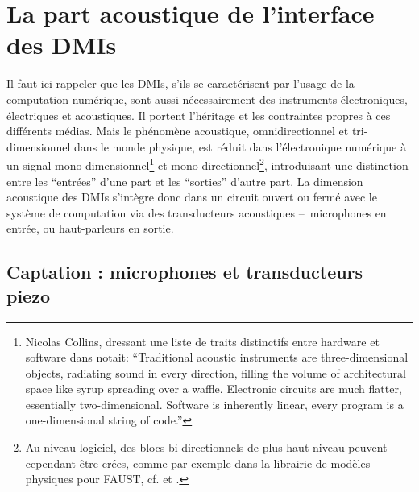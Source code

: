 \section{La part acoustique de l'interface des DMIs}
\label{sec:interfaces:part_acoustique}

\noindent Il faut ici rappeler que les \glspl{DMI}, s'ils se caractérisent par l'usage de la computation numérique, sont aussi nécessairement des instruments électroniques, électriques et acoustiques. Il portent l'héritage et les contraintes propres à ces différents médias. Mais le phénomène acoustique, omnidirectionnel et tri-dimensionnel dans le monde physique, est réduit dans l'électronique numérique à un signal mono-dimensionnel\footnote{Nicolas Collins, dressant une liste de traits distinctifs entre hardware et software dans \cite{collins_semiconducting_2013} notait: ``Traditional acoustic instruments are three-dimensional objects, radiating sound in every direction, filling the volume of architectural space like syrup spreading over a waffle. Electronic circuits are much flatter, essentially two-dimensional. Software is inherently linear, every program is a one-dimensional string of code.''} et mono-directionnel\footnote{Au niveau logiciel, des blocs bi-directionnels de plus haut niveau peuvent cependant être crées, comme par exemple dans la librairie de modèles physiques pour \gls{FAUST}, cf. \cite{berdahl_introduction_2012} et \cite{michon_faust_2018}.}, introduisant une distinction entre les ``entrées'' d'une part et les ``sorties'' d'autre part. La dimension acoustique des \glspl{DMI} s'intègre donc dans un circuit ouvert ou fermé avec le système de computation via des transducteurs acoustiques --~microphones en entrée, ou haut-parleurs en sortie.\\

\subsection{Captation : microphones et transducteurs piezo}

